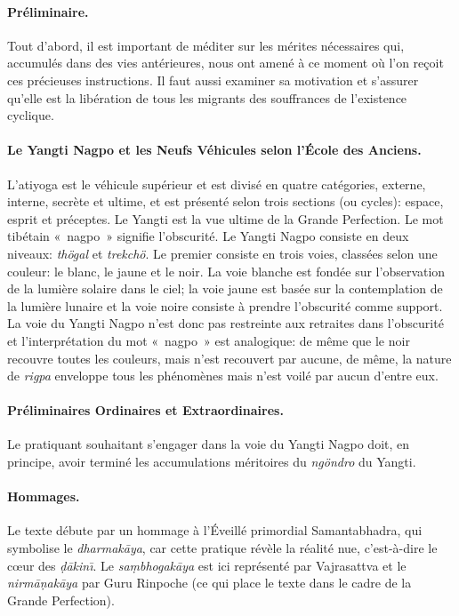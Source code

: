 \documentclass[11pt,a4paper]{article}
\title{\yangti}
\author{Ketsün Sangpo Rinpoche}
\date{24--27 Juin 2008}
\newcommand\yangti{Yangti Nagpo\xspace}
\begin{document}
\maketitle

\paragraph{Préliminaire.}

Tout d'abord, il est important de méditer sur les mérites nécessaires
qui, accumulés dans des vies antérieures, nous ont amené à ce moment
où l'on reçoit ces précieuses instructions. Il faut aussi examiner sa
motivation et s'assurer qu'elle est la libération de tous les migrants
des souffrances de l'existence cyclique.

\paragraph{Le \yangti et les Neufs Véhicules selon l'École des
  Anciens.}

L'atiyoga est le véhicule supérieur et est divisé en quatre
catégories, externe, interne, secrète et ultime, et est présenté selon
trois sections (ou cycles): espace, esprit et préceptes. Le Yangti est
la vue ultime de la Grande Perfection. Le mot tibétain «~nagpo~»
signifie l'obscurité. Le Yangti Nagpo consiste en deux niveaux:
\emph{thögal} et \emph{trekchö}. Le premier consiste en trois voies,
classées selon une couleur: le blanc, le jaune et le noir. La voie
blanche est fondée sur l'observation de la lumière solaire dans le
ciel; la voie jaune est basée sur la contemplation de la lumière
lunaire et la voie noire consiste à prendre l'obscurité comme
support. La voie du Yangti Nagpo n'est donc pas restreinte aux
retraites dans l'obscurité et l'interprétation du mot «~nagpo~» est
analogique: de même que le noir recouvre toutes les couleurs, mais
n’est recouvert par aucune, de même, la nature de \emph{rigpa}
enveloppe tous les phénomènes mais n’est voilé par aucun d’entre eux.

\paragraph{Préliminaires Ordinaires et Extraordinaires.}

Le pratiquant souhaitant s'engager dans la voie du \yangti doit, en
principe, avoir terminé les accumulations méritoires du \emph{ngöndro}
du Yangti.

\paragraph{Hommages.} Le texte débute par un hommage à l'Éveillé
primordial Samantabhadra, qui symbolise le \emph{dharmak\=aya}, car
cette pratique révèle la réalité nue, c'est\hyp{}à\hyp{}dire le
c{\oe}ur des \emph{\d{d}\=akin\=\i}. Le \emph{sa\d{m}bhogak\=aya} est
ici représenté par Vajrasattva et le \emph{nirm\=a\d{n}ak\=aya} par
Guru Rinpoche (ce qui place le texte dans le cadre de la Grande
Perfection).
\end{document}

